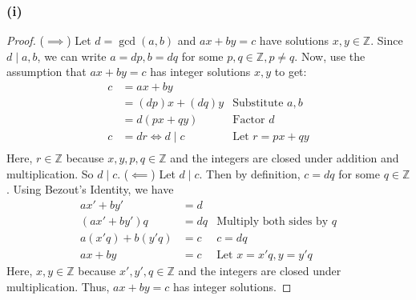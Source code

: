 \documentclass[13pt]{article}
\begin{document}
\subsubsection*{(i)}
\begin{proof}
  ($\implies$) Let $d = \gcd(a, b)$ and $ax + by = c$ have solutions $x, y \in \mathbb{Z}$. Since $d
  \mid a, b$, we can write $a = dp, b = dq$ for some $p, q \in \mathbb{Z}, p \neq q$. Now, use the
  assumption that $ax + by = c$ has integer solutions $x, y$ to get:
  \begin{align*}
    c &= ax + by \\
      &= (dp)x + (dq)y & \text{Substitute } a, b \\
      &= d(px + qy) & \text{Factor } d \\
    c &= dr \iff d \mid c & \text{Let } r = px + qy \\
  \end{align*}
  Here, $r \in \mathbb{Z}$ because $x, y, p, q \in \mathbb{Z}$ and the integers are closed under
  addition and multiplication. So $d \mid c$.
  \newline
  \newline
  ($\impliedby$) Let $d \mid c$. Then by definition, $c = dq$ for some $q \in \mathbb{Z}$. Using
  Bezout's Identity, we have
  \begin{align*}
    ax' + by' &= d \\
    (ax' + by')q &= dq & \text{Multiply both sides by } q \\
    a(x'q) + b(y'q) &= c & c = dq \\
    ax + by &= c & \text{Let } x = x'q, y = y'q
  \end{align*}
  Here, $x, y \in \mathbb{Z}$ because $x', y', q \in \mathbb{Z}$ and the integers are closed under
  multiplication. Thus, $ax + by = c$ has integer solutions.
\end{proof}
\end{document}
